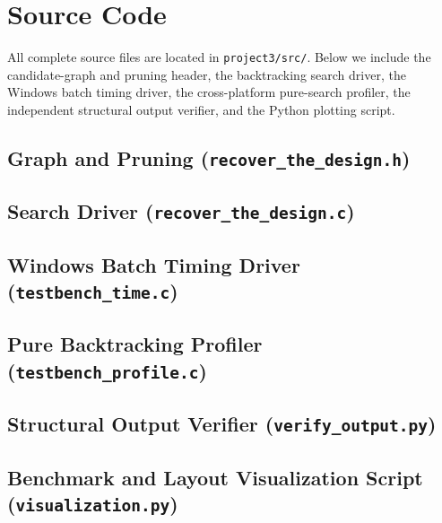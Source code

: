\documentclass[10pt, a4paper]{article}
\newcommand{\code}[1]{\texttt{\color{primary!90!black}#1}}
\begin{document}
\section{Source Code}

All complete source files are located in \code{project3/src/}. Below we include the candidate-graph and pruning header, the backtracking search driver, the Windows batch timing driver, the cross-platform pure-search profiler, the independent structural output verifier, and the Python plotting script.

\subsection{Graph and Pruning (\texttt{recover\_the\_design.h})}


\subsection{Search Driver (\texttt{recover\_the\_design.c})}


\subsection{Windows Batch Timing Driver (\texttt{testbench\_time.c})}


\subsection{Pure Backtracking Profiler (\texttt{testbench\_profile.c})}


\subsection{Structural Output Verifier (\texttt{verify\_output.py})}


\subsection{Benchmark and Layout Visualization Script (\texttt{visualization.py})}

\end{document}
